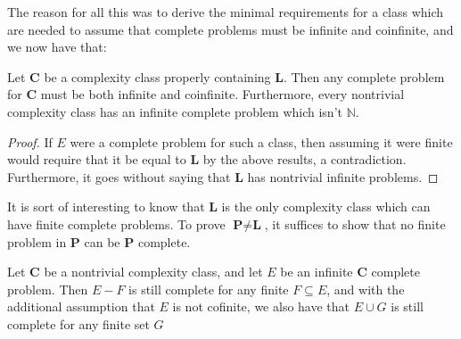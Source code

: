 The reason for all this was to derive the minimal requirements for a class which are needed to assume that complete problems must be infinite and coinfinite, and we now have that:
\begin{corollary}
	Let $\textbf{C}$ be a complexity class properly containing \textbf{L}. Then any complete problem for \textbf{C} must be both infinite and coinfinite. Furthermore, every nontrivial complexity class has an infinite complete problem which isn't $\mathbb{N}$.
\end{corollary}
\begin{proof}
	If $E$ were a complete problem for such a class, then assuming it were finite would require that it be equal to \textbf{L} by the above results, a contradiction. Furthermore, it goes without saying that \textbf{L} has nontrivial infinite problems.
\end{proof}
It is sort of interesting to know that \textbf{L} is the only complexity class which can have finite complete problems. To prove $\textbf{P} \neq \textbf{L}$, it suffices to show that no finite problem in \textbf{P} can be \textbf{P} complete.
\begin{lemma}
	Let \textbf{C} be a nontrivial complexity class, and let $E$ be an infinite \textbf{C} complete problem. Then $E-F$ is still complete for any finite $F \subseteq E$, and with the additional assumption that $E$ is not cofinite, we also have that $E \cup G$ is still complete for any finite set $G$
\end{lemma}
